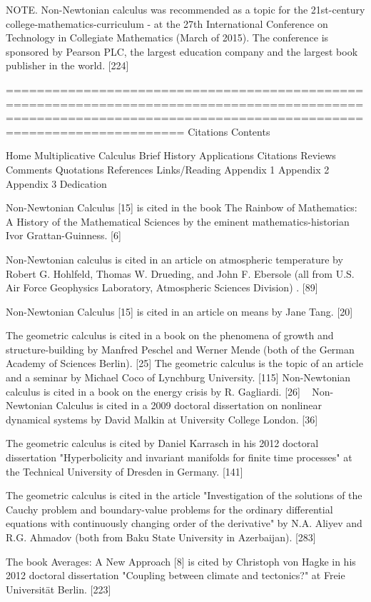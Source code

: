 \documentclass[12pt]{article}
\begin{document}
NOTE. Non-Newtonian calculus was recommended as a topic for the 21st-century college-mathematics-curriculum - at the 27th International Conference on Technology in Collegiate Mathematics (March of 2015). The conference is sponsored by Pearson PLC, the largest education company and the largest book publisher in the world. [224]

=================================================================================================================================================================
Citations
Contents

Home
Multiplicative Calculus
Brief History
Applications
Citations
Reviews
Comments
Quotations
References
Links/Reading
Appendix 1
Appendix 2
Appendix 3
Dedication

Non-Newtonian Calculus [15] is cited in the book The Rainbow of Mathematics: A History of the Mathematical Sciences by the eminent mathematics-historian Ivor Grattan-Guinness. [6]

Non-Newtonian calculus is cited in an article on atmospheric temperature by Robert G. Hohlfeld, Thomas W. Drueding, and John F. Ebersole (all from U.S. Air Force Geophysics Laboratory, Atmospheric Sciences Division) . [89]

Non-Newtonian Calculus [15] is cited in an article on means by Jane Tang. [20] 

The geometric calculus is cited in a book on the phenomena of growth and structure-building by Manfred Peschel and Werner Mende (both of the German Academy of Sciences Berlin). [25]
The geometric calculus is the topic of an article and a seminar by Michael Coco of Lynchburg University. [115]
Non-Newtonian calculus is cited in a book on the energy crisis by R. Gagliardi. [26]
 
Non-Newtonian Calculus is cited in a 2009 doctoral dissertation on nonlinear dynamical systems by David Malkin at University College London. [36]

The geometric calculus is cited by Daniel Karrasch in his 2012 doctoral dissertation "Hyperbolicity and invariant manifolds for finite time processes" at the Technical University of Dresden in Germany. [141]

The geometric calculus is cited in the article "Investigation of the solutions of the Cauchy problem and boundary-value problems for the ordinary differential equations with continuously changing order of the derivative" by N.A. Aliyev and R.G. Ahmadov (both from Baku State University in Azerbaijan). [283]

The book Averages: A New Approach [8] is cited by Christoph von Hagke in his 2012 doctoral dissertation "Coupling between climate and tectonics?" at Freie Universität Berlin. [223]
\end{document}
